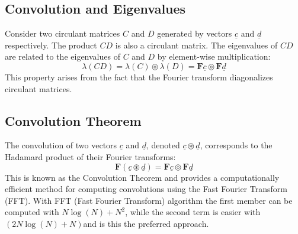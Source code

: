 \subsection*{Convolution and Eigenvalues}
Consider two circulant matrices \( C \) and \( D \) generated by vectors \( \underline{c} \) and \( \underline{d} \) respectively. The product \( CD \) is also a circulant matrix. The eigenvalues of \( CD \) are related to the eigenvalues of \( C \) and \( D \) by element-wise multiplication:
\[
\lambda(CD) = \lambda(C) \circledcirc  \lambda(D) = \mathbf{F} \underline{c} \circledcirc  \mathbf{F} \underline{d}
\]
This property arises from the fact that the Fourier transform diagonalizes circulant matrices.

\subsection*{Convolution Theorem}
The convolution of two vectors \( \underline{c} \) and \( \underline{d} \), denoted \( \underline{c} \circledast \underline{d} \), corresponds to the Hadamard product of their Fourier transforms:
\[
\mathbf{F}(\underline{c} \circledast \underline{d}) = \mathbf{F}\underline{c} \circledcirc \mathbf{F}\underline{d}
\]
This is known as the Convolution Theorem and provides a computationally efficient method for computing convolutions using the Fast Fourier Transform (FFT).
With FFT (Fast Fourier Transform) algorithm the first member can be computed with $ N\log(N) + N^2$, while the second term is easier with $(2N\log(N) + N)$and is this the preferred approach.